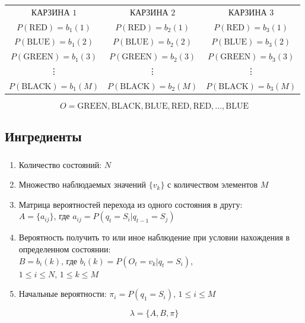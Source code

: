 \documentclass{beamer}
\begin{document}
\begin{frame} 
  \frametitle{\insertsection}
  \framesubtitle{\insertsubsection}

  \begin{table}
    \begin{tabular}{ccc}
      КАРЗИНА $1$ & КАРЗИНА $2$ & КАРЗИНА $3$ \\
      $P(\text{RED}) = b_1(1)$ & $P(\text{RED}) = b_2(1)$ & $P(\text{RED}) = b_3(1)$ \\
      $P(\text{BLUE}) = b_1(2)$ & $P(\text{BLUE}) = b_2(2)$ & $P(\text{BLUE}) = b_3(2)$ \\
      $P(\text{GREEN}) = b_1(3)$ & $P(\text{GREEN}) = b_2(3)$ & $P(\text{GREEN}) = b_3(3)$ \\
      \vdots & \vdots & \vdots \\
      $P(\text{BLACK}) = b_1(M)$ & $P(\text{BLACK}) = b_2(M)$ & $P(\text{BLACK}) = b_3(M)$ \\ 
    \end{tabular}
  \end{table}
  
  \begin{equation*}
  O = \text{GREEN},  \text{BLACK}, \text{BLUE}, \text{RED}, \text{RED}, \ldots, \text{BLUE}    
  \end{equation*}

\end{frame}

\subsection{Ингредиенты}

\begin{frame} 
  \frametitle{\insertsection}
  \framesubtitle{\insertsubsection}
  \begin{enumerate}
  \item Количество состояний: $N$ \pause
  \item Множество наблюдаемых значений $\{v_k\}$ с количеством элементов $M$ \pause
  \item Матрица вероятностей перехода из одного состояния в другу: \\
    $A = \{a_{ij}\}$, где $a_{ij} = P(q_t = S_i | q_{t - 1} = S_j)$ \pause
  \item Вероятность получить то или иное наблюдение при условии нахождения в определенном состоянии: \\
    $B = {b_i(k)}$, где $b_i(k) = P(O_t = v_k | q_t = S_i)$, \\
    $1 \le i \le N$, $1 \le k \le M$ \pause
    \item Начальные вероятности: $\pi_i = P(q_1 = S_i)$, $1 \le i \le M$
  \end{enumerate}

  \pause
  \begin{equation*}
    \lambda = \{A, B, \pi\}  %
  \end{equation*}

\end{frame}
\end{document}
